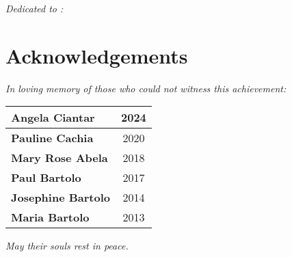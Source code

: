 \pagebreak
\clearpage
\vspace*{\fill}
\hspace{4cm} \hfill \textit{Dedicated to :}
\vspace*{\fill}
\clearpage

\chapter*{Acknowledgements}




\vspace*{\fill}
\begin{center}
\vspace*{0.05\textheight} %
\Large \textit{In loving memory of those who could not witness this achievement:}
    
    
\vspace{0.03\textheight}
\large
\begin{tabular}{lc}
    \textbf{Angela Ciantar} & 2024\\ \hline
    \textbf{Pauline Cachia} & 2020\\ \hline
    \textbf{Mary Rose Abela} & 2018\\ \hline
    \textbf{Paul Bartolo} & 2017\\ \hline
    \textbf{Josephine Bartolo} & 2014\\ \hline
    \textbf{Maria Bartolo} & 2013\\ \hline
\end{tabular}

\vspace*{0.03\textheight} %
\Large \textit{May their souls rest in peace.}

\end{center}

